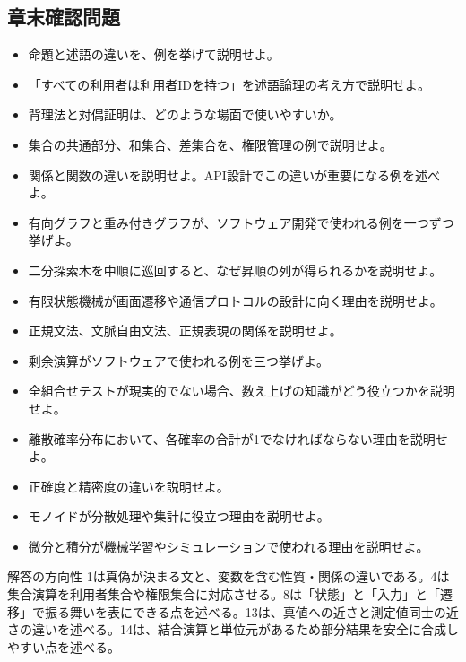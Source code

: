 \subsection{章末確認問題}
\begin{itemize}[leftmargin=2em]
\item 命題と述語の違いを、例を挙げて説明せよ。
\item 「すべての利用者は利用者IDを持つ」を述語論理の考え方で説明せよ。
\item 背理法と対偶証明は、どのような場面で使いやすいか。
\item 集合の共通部分、和集合、差集合を、権限管理の例で説明せよ。
\item 関係と関数の違いを説明せよ。API設計でこの違いが重要になる例を述べよ。
\item 有向グラフと重み付きグラフが、ソフトウェア開発で使われる例を一つずつ挙げよ。
\item 二分探索木を中順に巡回すると、なぜ昇順の列が得られるかを説明せよ。
\item 有限状態機械が画面遷移や通信プロトコルの設計に向く理由を説明せよ。
\item 正規文法、文脈自由文法、正規表現の関係を説明せよ。
\item 剰余演算がソフトウェアで使われる例を三つ挙げよ。
\item 全組合せテストが現実的でない場合、数え上げの知識がどう役立つかを説明せよ。
\item 離散確率分布において、各確率の合計が1でなければならない理由を説明せよ。
\item 正確度と精密度の違いを説明せよ。
\item モノイドが分散処理や集計に役立つ理由を説明せよ。
\item 微分と積分が機械学習やシミュレーションで使われる理由を説明せよ。
\end{itemize}
\begin{notebox}{解答の方向性}
1は真偽が決まる文と、変数を含む性質・関係の違いである。4は集合演算を利用者集合や権限集合に対応させる。8は「状態」と「入力」と「遷移」で振る舞いを表にできる点を述べる。13は、真値への近さと測定値同士の近さの違いを述べる。14は、結合演算と単位元があるため部分結果を安全に合成しやすい点を述べる。
\end{notebox}
